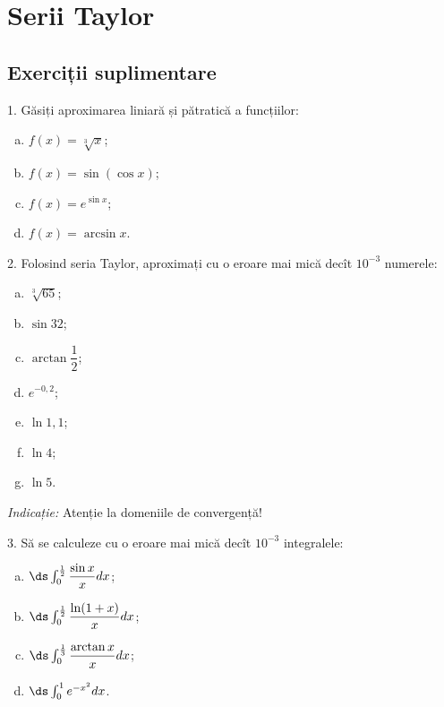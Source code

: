 \chapter{Serii Taylor}

\section{Exerciții suplimentare}

1. Găsiți aproximarea liniară și pătratică a funcțiilor:
\begin{enumerate}[(a)]
\item $ f(x) = \sqrt[3]{x} $;
\item $ f(x) = \sin(\cos x) $;
\item $ f(x) = e^{\sin x} $;
\item $ f(x) = \arcsin x $.
\end{enumerate}

\vspace{1cm}

2. Folosind seria Taylor, aproximați cu o eroare mai mică decît $ 10^{-3} $
numerele:
\begin{enumerate}[(a)]
\item $ \sqrt[3]{65} $;
\item $ \sin 32 $;
\item $ \arctan \dfrac{1}{2} $;
\item $ e^{-0,2} $;
\item $ \ln 1,1 $;
\item $ \ln 4 $;
\item $ \ln 5 $.
\end{enumerate}

\emph{Indicație:} Atenție la domeniile de convergență!

\vspace{1cm}

3. Să se calculeze cu o eroare mai mică decît $ 10^{-3} $ integralele:
\begin{enumerate}[(a)]
\item $ \ds\int_0^{\frac{1}{2}} \dfrac{\sin x}{x} dx $;
\item $ \ds\int_0^{\frac{1}{2}} \dfrac{\ln(1 + x)}{x} dx $;
\item $ \ds\int_0^{\frac{1}{3}} \dfrac{\arctan x}{x} dx $;
\item $ \ds\int_0^1 e^{-x^2} dx $.
\end{enumerate}

\vspace{1cm}

